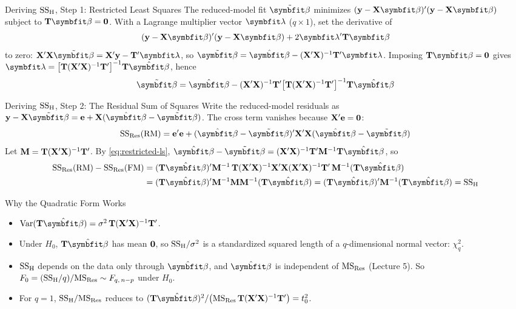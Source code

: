 \begin{frame}{Deriving $\mathrm{SS}_{\mathrm{H}}$, Step 1: Restricted Least Squares}
    The reduced-model fit $\tilde{\bbeta}$ minimizes $(\by-\bX\bbeta)'(\by-\bX\bbeta)$ subject to $\bT\bbeta=\bzero$. With a Lagrange multiplier vector $\blambda$ ($q\times1$), set the derivative of
    \[
    (\by-\bX\bbeta)'(\by-\bX\bbeta) + 2\blambda'\bT\bbeta
    \]
    to zero: $\bX'\bX\tilde{\bbeta}=\bX'\by-\bT'\blambda$, so $\tilde{\bbeta}=\hat{\bbeta}-(\bX'\bX)^{-1}\bT'\blambda$. Imposing $\bT\tilde{\bbeta}=\bzero$ gives $\blambda=\bigl[\bT(\bX'\bX)^{-1}\bT'\bigr]^{-1}\bT\hat{\bbeta}$, hence
    \begin{align}
        \tilde{\bbeta} = \hat{\bbeta} - (\bX'\bX)^{-1}\bT'\bigl[\bT(\bX'\bX)^{-1}\bT'\bigr]^{-1}\bT\hat{\bbeta}
        \label{eq:restricted-ls}
    \end{align}
\end{frame}


\begin{frame}{Deriving $\mathrm{SS}_{\mathrm{H}}$, Step 2: The Residual Sum of Squares}
    Write the reduced-model residuals as $\by-\bX\tilde{\bbeta}=\be+\bX(\hat{\bbeta}-\tilde{\bbeta})$. The cross term vanishes because $\mathbf{X}'\mathbf{e}=\mathbf{0}$:
    \[
    \SSRes(\RM) = \be'\be + (\hat{\bbeta}-\tilde{\bbeta})'\bX'\bX(\hat{\bbeta}-\tilde{\bbeta})
    \]
    Let $\mathbf{M}=\mathbf{T}(\mathbf{X}'\mathbf{X})^{-1}\mathbf{T}'$. By \eqref{eq:restricted-ls}, $\hat{\bbeta}-\tilde{\bbeta}=(\bX'\bX)^{-1}\bT'\mathbf{M}^{-1}\bT\hat{\bbeta}$, so
    \begin{align*}
        \SSRes(\RM)-\SSRes(\FM)
        &= (\bT\hat{\bbeta})'\mathbf{M}^{-1}\,\bT(\bX'\bX)^{-1}\bX'\bX(\bX'\bX)^{-1}\bT'\,\mathbf{M}^{-1}(\bT\hat{\bbeta}) \\
        &= (\bT\hat{\bbeta})'\mathbf{M}^{-1}\mathbf{M}\mathbf{M}^{-1}(\bT\hat{\bbeta}) = (\bT\hat{\bbeta})'\mathbf{M}^{-1}(\bT\hat{\bbeta}) = \SSH
    \end{align*}
\end{frame}


\begin{frame}{Why the Quadratic Form Works}
    \begin{itemize}
        \item $\Var(\bT\hat{\bbeta})=\sigma^2\,\bT(\bX'\bX)^{-1}\bT'$.
        \item Under $H_0$, $\bT\hat{\bbeta}$ has mean $\mathbf{0}$, so $\mathrm{SS}_{\mathrm{H}}/\sigma^2$ is a standardized squared length of a $q$-dimensional normal vector: $\chi^2_q$.
        \item $\mathrm{SS}_{\mathrm{H}}$ depends on the data only through $\hat{\bbeta}$, and $\hat{\bbeta}$ is independent of $\mathrm{MS}_{\mathrm{Res}}$ (Lecture 5). So $F_0=(\mathrm{SS}_{\mathrm{H}}/q)/\mathrm{MS}_{\mathrm{Res}}\sim F_{q,\,n-p}$ under $H_0$.
        \item For $q=1$, $\mathrm{SS}_{\mathrm{H}}/\mathrm{MS}_{\mathrm{Res}}$ reduces to $(\bT\hat{\bbeta})^2/\bigl(\MSRes\,\bT(\bX'\bX)^{-1}\bT'\bigr)=t_0^2$.
    \end{itemize}
\end{frame}


